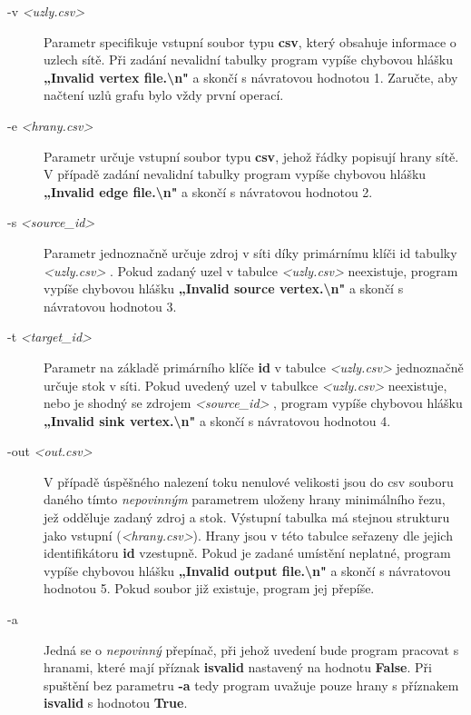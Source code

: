 \documentclass[12pt,a4paper]{article}
\begin{document}
	
	\begin{description}
	\item[-v \textit{\textless uzly.csv\textgreater}] Parametr specifikuje vstupní soubor typu \textbf{csv}, který obsahuje informace o uzlech sítě. Při zadání nevalidní tabulky program vypíše chybovou hlášku {\textbf{„Invalid vertex file.\textbackslash n"}} a skončí s návratovou hodnotou 1. Zaručte,
	aby načtení uzlů grafu bylo vždy první operací.
	\item[-e \textit{\textless hrany.csv\textgreater}] Parametr určuje vstupní soubor typu {\textbf{csv}}, jehož řádky popisují hrany sítě. V případě zadání nevalidní tabulky program vypíše chybovou hlášku {\textbf{„Invalid edge file.\textbackslash n"}} a skončí s návratovou hodnotou 2.
	\item[-s \textit{\textless source\_id\textgreater}] Parametr jednoznačně určuje zdroj v síti díky primárnímu klíči id tabulky \textit{\textless uzly.csv\textgreater} . Pokud zadaný uzel v tabulce \textit{\textless uzly.csv\textgreater} neexistuje, program vypíše chybovou hlášku \textbf{„Invalid source vertex.\textbackslash n"} a skončí s návratovou hodnotou 3.
	\item[-t \textit{\textless target\_id\textgreater}] Parametr na základě primárního klíče \textbf{id} v tabulce \textit{\textless uzly.csv\textgreater} jednoznačně určuje stok v síti. Pokud uvedený uzel v tabulkce \textit{\textless uzly.csv\textgreater} neexistuje, nebo je shodný se zdrojem \textit{\textless source\_id\textgreater} , program vypíše chybovou hlášku \textbf{„Invalid sink vertex.\textbackslash n"} a skončí s návratovou hodnotou 4.
	\newpage
	\item[-out \textit{\textless out.csv\textgreater}] V případě úspěšného nalezení toku nenulové velikosti jsou do csv souboru daného tímto \textit{nepovinným} parametrem uloženy hrany minimálního řezu, jež odděluje zadaný zdroj a stok. Výstupní tabulka má stejnou strukturu jako vstupní (\textit{\textless hrany.csv\textgreater}). Hrany jsou v této tabulce seřazeny dle jejich identifikátoru \textbf{id} vzestupně. Pokud je zadané umístění neplatné, program vypíše chybovou hlášku \textbf{„Invalid output file.\textbackslash n"} a skončí s návratovou hodnotou 5. Pokud soubor již existuje, program jej přepíše.
	
	\item[-a] Jedná se o \textit{nepovinný} přepínač, při jehož uvedení bude program pracovat s hranami, které mají příznak \textbf{isvalid} nastavený na hodnotu \textbf{False}. Při spuštění bez parametru \textbf{-a} tedy program uvažuje pouze hrany s příznakem \textbf{isvalid} s hodnotou \textbf{True}.
	
	\end{description}
	
\end{document}
